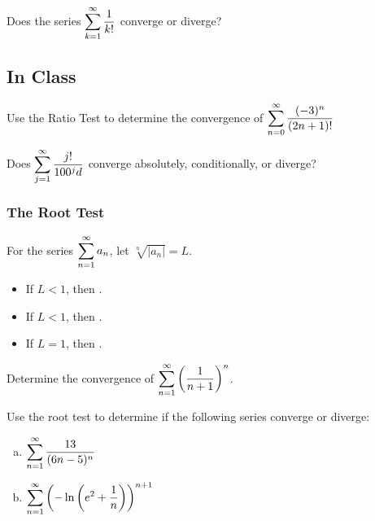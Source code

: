 \documentclass[notes]{subfiles}
\begin{document}
		\begin{ex}
			Does the series $\displaystyle \sum_{k=1}^\infty \dfrac{1}{k!}$ converge or diverge?
		\end{ex}
			\newpage
			
		\newpage
		
	\subsection*{In Class}
		\begin{ex}
			Use the Ratio Test to determine the convergence of $\displaystyle \sum_{n=0}^\infty \dfrac{(-3)^n}{(2n+1)!}$
		\end{ex}
			
		\begin{ex}
			Does $\displaystyle \sum_{j=1}^\infty \dfrac{j!}{100^jd}$ converge absolutely, conditionally, or diverge?
		\end{ex}
			
	\subsubsection*{The Root Test}
		\begin{rmk}
			For the series $\displaystyle \sum_{n=1}^\infty a_n$, let $\sqrt[n]{|a_n|} = L$.\\[15pt]
			\begin{itemize}
				\setlength\itemsep{15pt}
				
				\item If $L < 1$, then .
				\item If $L < 1$, then .
				\item If $L = 1$, then .
			\end{itemize}
		\end{rmk}
			\newpage
			
		\begin{ex}
			Determine the convergence of $\displaystyle \sum_{n=1}^\infty \left( \dfrac{1}{n+1}\right)^n$.
		\end{ex}
			
		\begin{ex}
			Use the root test to determine if the following series converge or diverge:
			\begin{enumerate}[(a)]
				\item $\displaystyle \sum_{n=1}^\infty \dfrac{13}{(6n-5)^n}$
				\item $\displaystyle \sum_{n=1}^\infty \left( -\ln \left( e^2 + \dfrac{1}{n}\right)\right)^{n+1}$
			\end{enumerate}
		\end{ex}
			\newpage
			
\end{document}
